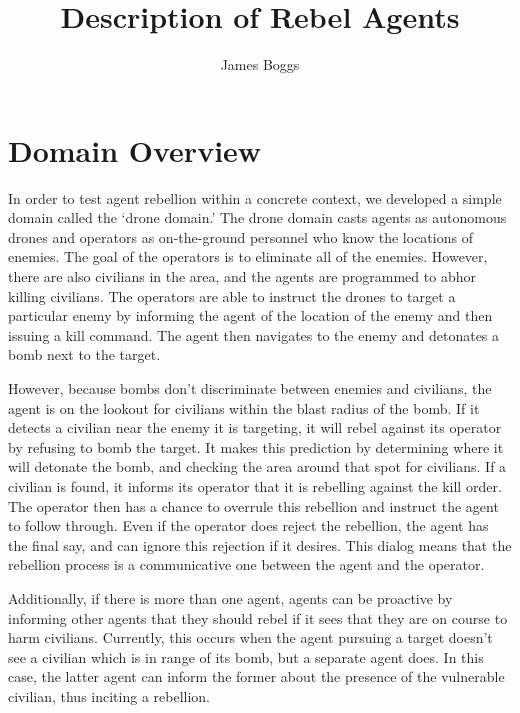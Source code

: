 \documentclass[letterpaper,11pt]{article}
\title{Description of Rebel Agents}
\author{James Boggs}
\begin{document}
	\maketitle
	\section{Domain Overview}
	In order to test agent rebellion within a concrete context, we developed a simple domain called the `drone domain.' The drone domain casts agents as autonomous drones and operators as on-the-ground personnel who know the locations of enemies. The goal of the operators is to eliminate all of the enemies. However, there are also civilians in the area, and the agents are programmed to abhor killing civilians. The operators are able to instruct the drones to target a particular enemy by informing the agent of the location of the enemy and then issuing a kill command. The agent then navigates to the enemy and detonates a bomb next to the target. \par
	
	However, because bombs don't discriminate between enemies and civilians, the agent is on the lookout for civilians within the blast radius of the bomb. If it detects a civilian near the enemy it is targeting, it will rebel against its operator by refusing to bomb the target. It makes this prediction by determining where it will detonate the bomb, and checking the area around that spot for civilians. If a civilian is found, it informs its operator that it is rebelling against the kill order. The operator then has a chance to overrule this rebellion and instruct the agent to follow through. Even if the operator does reject the rebellion, the agent has the final say, and can ignore this rejection if it desires. This dialog means that the rebellion process is a communicative one between the agent and the operator. \par
	
	Additionally, if there is more than one agent, agents can be proactive by informing other agents that they should rebel if it sees that they are on course to harm civilians. Currently, this occurs when the agent pursuing a target doesn't see a civilian which is in range of its bomb, but a separate agent does. In this case, the latter agent can inform the former about the presence of the vulnerable civilian, thus inciting a rebellion. \par
	
\end{document}
